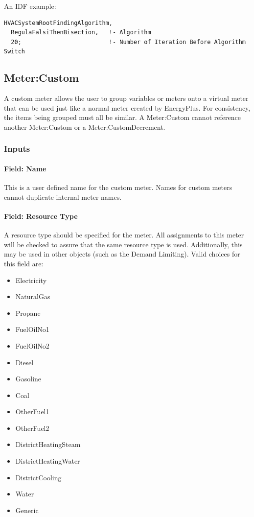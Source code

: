 An IDF example:

\begin{lstlisting}
HVACSystemRootFindingAlgorithm,
  RegulaFalsiThenBisection,   !- Algorithm
  20;                         !- Number of Iteration Before Algorithm Switch
\end{lstlisting}

\subsection{Meter:Custom}\label{metercustom}

A custom meter allows the user to group variables or meters onto a virtual meter that can be used just like a normal meter created by EnergyPlus. For consistency, the items being grouped must all be similar. A Meter:Custom cannot reference another Meter:Custom or a Meter:CustomDecrement.

\subsubsection{Inputs}\label{inputs-17-008}

\paragraph{Field: Name}\label{field-name-043}

This is a user defined name for the custom meter. Names for custom meters cannot duplicate internal meter names.

\paragraph{Field: Resource Type}\label{field-fuel-type-004}

A resource type should be specified for the meter. All assignments to this meter will be checked to assure that the same resource type is used. Additionally, this may be used in other objects (such as the Demand Limiting). Valid choices for this field are:

\begin{itemize}
    \item
    Electricity
    \item
    NaturalGas
    \item
    Propane
    \item
    FuelOilNo1
    \item
    FuelOilNo2
    \item
    Diesel
    \item
    Gasoline
    \item
    Coal
    \item
    OtherFuel1
    \item
    OtherFuel2
    \item
    DistrictHeatingSteam
    \item
    DistrictHeatingWater
    \item
    DistrictCooling
    \item
    Water
    \item
    Generic
\end{itemize}

